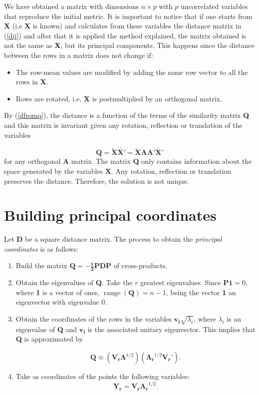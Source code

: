 \documentclass[11pt]{report}
\DeclareMathOperator{\range}{range}
\begin{document}
We have obtained a matrix with dimensions $n \times p$ with $p$ uncorrelated
variables that reproduce the initial metric. It is important to notice that if 
one starts from \textbf{X} (i.e \textbf{X} is known) and calculates from these
variables the distance matrix in (\ref{dij}) and after that it is applied
the method explained, the matrix obtained is not the same as \textbf{X}, but
its principal components. This happens since the distance between the rows in
a matrix does not change if:

\begin{itemize}
\item The row-mean values are modified by adding the same row vector to all
the rows in \textbf{X}.

\item Rows are rotated, i.e, \textbf{X} is postmultiplied by an orthogonal 
matrix.
\end{itemize}

\indent By (\ref{dfromq}), the distance is a function of the terms of the 
similarity matrix \textbf{Q} and this matrix is invariant given any rotation,
reflection or translation of the variables

\[
\mathbf{Q} = \mathbf{\widetilde{X}} \mathbf{\widetilde{X'}} = \mathbf{\widetilde{X}} \mathbf{A} \mathbf{A'}\mathbf{\widetilde{X'}}
\]
for any orthogonal \textbf{A} matrix. The matrix \textbf{Q} only contains 
information about the space generated by the variables \textbf{X}. Any rotation,
reflection or translation preserves the distance. Therefore, the solution
is not unique.


\section{Building principal coordinates}
Let \textbf{D} be a square distance matrix. The process to obtain 
the \textit{principal coordinates} is as follows:

\begin{enumerate}
\item Build the matrix $\mathbf{Q = - \frac{1}{2} PDP}$ of cross-products.
\item Obtain the eigenvalues of \textbf{Q}. Take the $r$ greatest eigenvalues. 
Since $\mathbf{P1}=0$, where \textbf{1} is a vector of ones, 
$\range(\mathbf{Q})=n-1$, being the vector \textbf{1} an eigenvector with 
eigenvalue 0. 
\item Obtain the coordinates of the rows in the variables 
$\mathbf{v_i}\sqrt{\lambda_i}$,
where $\lambda_i$ is an eigenvalue of \textbf{Q} and $\mathbf{v_i}$ is the
associated unitary eigenvector. This implies that \textbf{Q} is approximated by

\[
\mathbf{Q} \approx (\mathbf{V_r \Lambda}^{1/2})(\mathbf{\Lambda_r}^{1/2} \mathbf{V_r'}).
\]

\item Take as coordinates of the points the following variables:
\[
\mathbf{Y_r} = \mathbf{V_r}\mathbf{\Lambda_r}^{1/2}.
\]
\end{enumerate}
\end{document}
